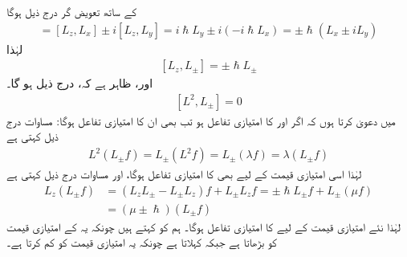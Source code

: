  کے ساتھ تعویض گر درج ذیل ہوگا 
\begin{align*} 
[L_z, L_{\pm}] = [L_z, L_x] \pm i [L_z, L_y] = i \hslash L_y \pm i (- i \hslash L_x) = \pm \hslash (L_x \pm i L_y)
\end{align*}
لہٰذا 
\begin{align}\label{مساوات_تین_ابعادی_ایک_اور_سیڑھی}
[L_z, L_{\pm}] = \pm \hslash L_{\pm}
\end{align}
اور، ظاہر ہے کہ، درج ذیل ہو گا۔ 
\begin{align}\label{مساوات_تین_ابعادی_مربع_اور_سیڑھی}
[L^2, L_{\pm}] = 0
\end{align}
میں دعویٰ کرتا ہوں کہ اگر  اور  کا امتیازی تفاعل  ہو تب  بھی ان کا امتیازی تفاعل ہوگا: مساوات درج ذیل کہتی ہے 
\begin{align}
L^2 (L_{\pm} f) = L_{\pm} (L^2 f) = L_{\pm} (\lambda f) = \lambda (L_{\pm} f)
\end{align}
لہٰذا اسی امتیازی قیمت  کے لیے  بھی  کا امتیازی تفاعل ہوگا، اور مساوات  درج ذیل کہتی ہے 
\begin{align}
L_z (L_{\pm} f) &= (L_z L_{\pm} - L_{\pm} L_z) f + L_{\pm} L_z f = \pm \hslash L_\pm f + L_{\pm} (\mu f) \nonumber \\
&= (\mu \pm \hslash ) (L_{\pm} f)
\end{align}
لہٰذا نئے امتیازی قیمت  کے لیے  کا  امتیازی تفاعل ہوگا۔ ہم  کو  کہتے ہیں چونکہ یہ  کے امتیازی قیمت کو  بڑھاتا ہے جبکہ   کہلاتا ہے چونکہ یہ امتیازی قیمت کو  کم کرتا ہے۔

